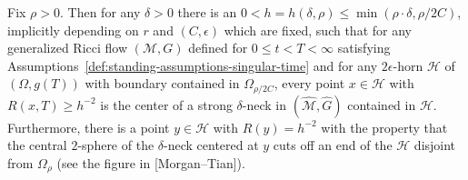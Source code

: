 \begin{theorem}
\label{thm:deep-delta-necks-in-horn}
\label{hexist}
Fix $\rho>0$. Then for any $\delta>0$ there is an
$0<h=h(\delta,\rho)\le \min(\rho\cdot\delta,\rho/2C)$,
implicitly depending on $r$ and $(C,\epsilon)$ which are fixed, such
that for any generalized Ricci flow $({\mathcal M},G)$ defined for
$0\le t<T<\infty$ satisfying Assumptions~\ref{def:standing-assumptions-singular-time} and for
any $2\epsilon$-horn ${\mathcal H}$ of $(\Omega,g(T))$ with boundary
contained in $\Omega_{\rho/2C}$, every point $x\in {\mathcal H}$
with $R(x,T)\ge h^{-2}$ is the center of a strong
$\delta$-neck in $(\widehat{\mathcal
M},\widehat G)$ contained in ${\mathcal H}$. Furthermore, there is a
point $y\in {\mathcal H}$ with $R(y)=h^{-2}$ with the property that
the central $2$-sphere of the $\delta$-neck centered at $y$ cuts off
an end of the ${\mathcal H}$ disjoint from $\Omega_\rho$ (see the figure in [Morgan--Tian]).
\end{theorem}




